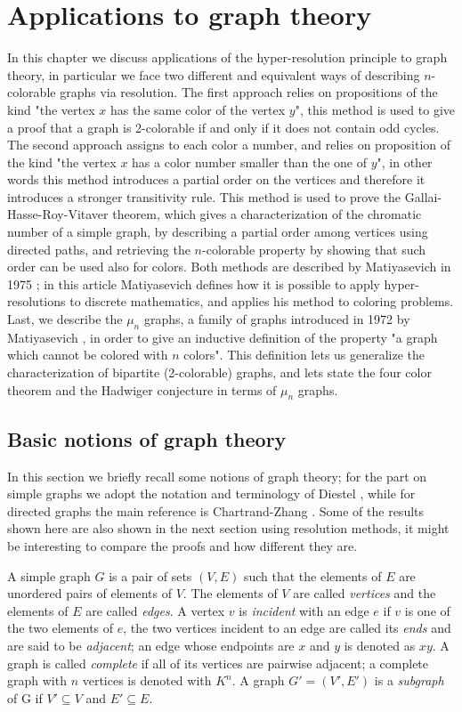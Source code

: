 \documentclass[a4paper,12pt,oneside]{book}
\begin{document}
\chapter{Applications to graph theory}%
In this chapter we discuss applications of the hyper-resolution principle to graph theory, in particular we  face two different and equivalent ways of describing $n$-colorable graphs via resolution. The first approach relies on propositions of the kind "the vertex $x$ has the same color of the vertex $y$", this method is used to give a proof that a graph is 2-colorable if and only if it does not contain odd cycles. The second approach assigns to each color a number, and relies on proposition of the kind "the vertex $x$ has a color number smaller than the one of $y$", in other words this method introduces a partial order on the vertices and therefore it introduces a stronger transitivity rule. This method is used to prove the Gallai-Hasse-Roy-Vitaver theorem, which gives a characterization of the chromatic number of a simple graph, by describing a partial order among vertices using directed paths, and retrieving the $n$-colorable property by showing that such order can be used also for colors. 
Both methods are described by Matiyasevich in 1975 \cite{mat-1}; in this article Matiyasevich defines how it is possible to apply hyper-resolutions to discrete mathematics, and applies his method to coloring problems.
Last, we describe the $\mu_n$ graphs, a family of graphs introduced in 1972 by Matiyasevich \cite{mat-2}, in order to give an inductive definition of the property "a graph which cannot be colored with $n$ colors". This definition lets us generalize the characterization of bipartite (2-colorable) graphs, and lets state the four color theorem and the Hadwiger conjecture in terms of $\mu_n$ graphs.


\section{Basic notions of graph theory}

In this section we briefly recall some notions of graph theory; for the part on simple graphs we adopt the notation and terminology of Diestel \cite{diestel}, while for directed graphs the main reference is Chartrand-Zhang \cite{chrom}. Some of the results shown here are also shown in the next section using resolution methods, it might be interesting to compare the proofs and how different they are.

A simple graph $G$ is a pair of sets $(V,E)$ such that the elements of $E$ are unordered pairs of elements of $V$. The elements of $V$ are called \textit{vertices} and the elements of $E$ are called \textit{edges}. A vertex $v$ is \textit{incident} with an edge $e$ if $v$ is one of the two elements of $e$, the two vertices incident to an edge are called its \textit{ends} and are said to be \textit{adjacent}; an edge whose endpoints are $x$ and $y$ is denoted as $xy$. A graph is called  \textit{complete} if all of its vertices are pairwise adjacent; a complete graph with $n$ vertices is denoted with $K^n$.
A graph $G'=(V',E')$ is a \textit{subgraph} of G if $V' \subseteq V$ and $E' \subseteq E$.
\end{document}
